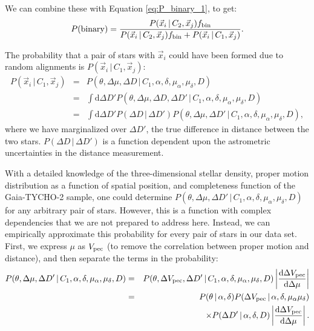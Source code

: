 \documentclass[12pt, preprint]{aastex}
\newcommand{\given}{\,|\,}
\newcommand{\dd}{\mathrm{d}}
\begin{document}
We can combine these with Equation \ref{eq:P_binary_1}, to get:
\begin{equation}
P({\rm binary}) = \frac{P(\vec{x}_i \given C_2, \vec{x}_j) f_{\rm bin} }{P(\vec{x}_i \given C_2, \vec{x}_j) f_{\rm bin}  + P(\vec{x}_i \given C_1, \vec{x}_j) }. \label{eq:P_binary_2}
\end{equation}




The probability that a pair of stars with $\vec{x}_i$ could have been formed due to random alignments is $P(\vec{x}_i \given C_1, \vec{x}_j)$:
\begin{eqnarray}
P(\vec{x}_i \given C_1, \vec{x}_j) &=& P(\theta, \Delta \mu, \Delta D \given C_1, \alpha, \delta, \mu_{\alpha}, \mu_{\delta}, D ) \\
&=& \int \dd \Delta D' P(\theta, \Delta \mu, \Delta D, \Delta D' \given C_1, \alpha, \delta, \mu_{\alpha}, \mu_{\delta}, D ) \\
&=& \int \dd \Delta D' P(\Delta D \given \Delta D') P(\theta, \Delta \mu, \Delta D' \given C_1, \alpha, \delta, \mu_{\alpha}, \mu_{\delta}, D ), \label{eq:P_noise_marginalized}
\end{eqnarray}
where we have marginalized over $\Delta D'$, the true difference in distance between the two stars. $P(\Delta D \given \Delta D')$ is a function dependent upon the astrometric uncertainties in the distance measurement.

With a detailed knowledge of the three-dimensional stellar density, proper motion distribution as a function of spatial position, and completeness function of the Gaia-TYCHO-2 sample, one could determine $P(\theta, \Delta \mu, \Delta D' \given C_1, \alpha, \delta, \mu_{\alpha}, \mu_{\delta}, D )$ for any arbitrary pair of stars. However, this is a function with complex dependencies that we are not prepared to address here. Instead, we can empirically approximate this probability for every pair of stars in our data set. First, we express $\mu$ as $V_{\rm pec}$ (to remove the correlation between proper motion and distance), and then separate the terms in the probability:
\begin{eqnarray}
P(\theta, \Delta \mu, \Delta D' \given C_1, \alpha, \delta, \mu_{\alpha}, \mu_{\delta}, D ) &=& P(\theta, \Delta V_{\rm pec}, \Delta D' \given C_1, \alpha, \delta, \mu_{\alpha}, \mu_{\delta}, D ) \left| \frac{\dd \Delta V_{\rm pec}}{\dd \Delta \mu} \right| \label{eq:P_obs_noise} \\
&=& P(\theta \given \alpha, \delta) 
  P(\Delta V_{\rm pec} \given \alpha, \delta, \mu_{\alpha} \mu_{\delta}) \nonumber \\
  & & \qquad \times  P(\Delta D' \given \alpha, \delta, D) \left| \frac{\dd \Delta V_{\rm pec}}{\dd \Delta \mu} \right|. \label{eq:P_obs_noise_split} 
\end{eqnarray}
\end{document}
